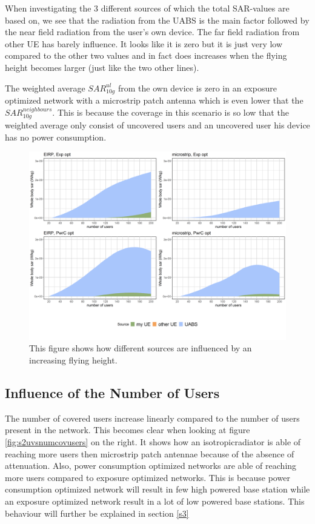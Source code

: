 When investigating the 3 different sources of which the total \gls{SAR}-values are based on, we see 
that the radiation from the \gls{UABS} is the main factor followed by the near field radiation from the user's own device.
The far field radiation from other \gls{UE} has barely influence. 
It looks like it is zero but it is just very low compared to the other two values and in fact does increases when the flying height becomes larger (just like the two other lines).

The weighted average $SAR^{ul}_{10g}$ from the own device is zero in an exposure optimized network with a microstrip patch antenna which is even lower that the $SAR^{neighbours}_{10g}$.
This is because the coverage in this scenario is so low that the weighted average only consist of uncovered users and an uncovered user his device has no power consumption.
\begin{figure}[h!]
  \includegraphics[width=\textwidth]{../results/s2/fhFourSources.png}
  \caption{This figure shows how different sources are influenced by an increasing flying height.}
  \label{fig:s2shfourSourcesMatrix}
\end{figure}

\FloatBarrier
\subsection{Influence of the Number of Users}
\label{s2b}

The number of covered users increase linearly compared to the number of users present in the network. This becomes clear when looking at figure 
\ref{fig:s2uvsnumcovusers} on the right. It shows how an \gls{isotropicradiator} is able of reaching more users then microstrip patch antennae because of the absence of attenuation.
Also, power consumption optimized networks are able of reaching more users compared to exposure optimized networks.
This is because power consumption optimized network will result in few high powered base station while an 
exposure optimized network result in a lot of low powered base stations. This behaviour will further be explained in section \ref{s3}

